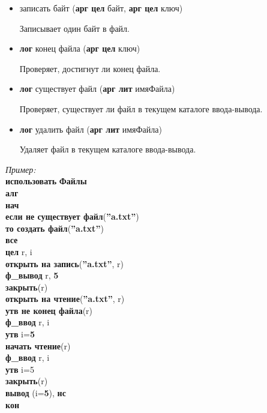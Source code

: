 \begin{itemize}
\item записать байт (\textbf{арг цел} байт, \textbf{арг цел} ключ)

Записывает один байт в файл.


\item \textbf{лог} конец файла (\textbf{арг цел} ключ)

Проверяет, достигнут ли конец файла.

\item \textbf{лог} существует файл (\textbf{арг лит} имяФайла)

Проверяет, существует ли файл в текущем каталоге ввода-вывода.

\item \textbf{лог} удалить файл (\textbf{арг лит} имяФайла)

Удаляет файл в текущем каталоге ввода-вывода.

\end{itemize}

\emph{Пример:}\\
{\sffamily
\textbf{использовать} \textbf{\textcolor{kisp}{Файлы}}\\
\textbf{алг}\\
\textbf{нач}\\
\otstup \textbf{если не \textcolor{kalg}{существует файл}}(\textbf{\textcolor{kvalue}{''a.txt''}})\\
\otstup \otstup \textbf{то \textcolor{kalg}{создать файл}}(\textbf{\textcolor{kvalue}{''a.txt''}})\\
\otstup \textbf{все}\\
\otstup \textbf{\textcolor{ktype}{цел}} r, i\\
\otstup \textbf{\textcolor{kalg}{открыть на запись}}(\textbf{\textcolor{kvalue}{''a.txt''}}, r)\\
\otstup \textbf{ф\_вывод} r, \textbf{\textcolor{kvalue}{5}}\\
\otstup \textbf{\textcolor{kalg}{закрыть}}(r)\\
\otstup \textbf{\textcolor{kalg}{открыть на чтение}}(\textbf{\textcolor{kvalue}{''a.txt''}}, r)\\
\otstup \textbf{утв не \textcolor{kalg}{конец файла}}(r)\\
\otstup \textbf{ф\_ввод} r, i\\
\otstup \textbf{утв} i=\textbf{\textcolor{kvalue}{5}}\\
\otstup \textbf{\textcolor{kalg}{начать чтение}}(r)\\
\otstup \textbf{ф\_ввод} r, i\\
\otstup \textbf{утв} i=\textcolor{kvalue}{5}\\
\otstup \textbf{\textcolor{kalg}{закрыть}}(r)\\
\otstup \textbf{вывод} (i=\textbf{\textcolor{kvalue}{5}}), \textbf{нс}\\
\textbf{кон}
}

